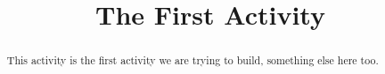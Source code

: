 \documentclass{ximera}
\title{The First Activity}
\begin{document}
\begin{abstract}
This activity is the first activity we are trying to build, something else here too.
\end{abstract}
\maketitle
\end{document}
